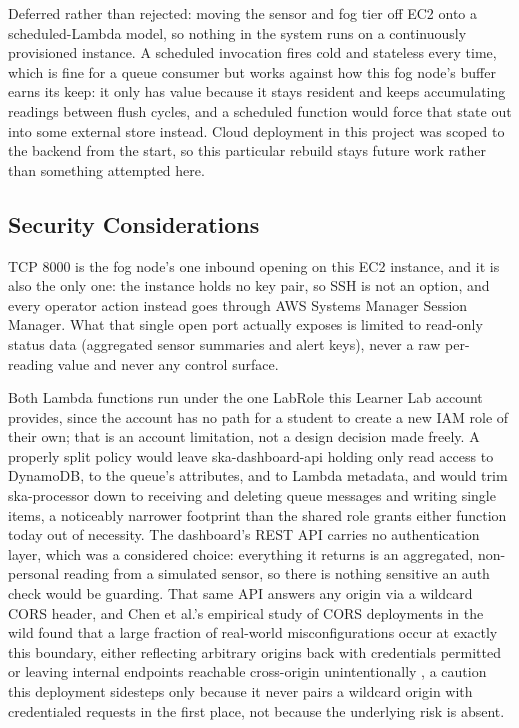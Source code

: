 \documentclass[conference]{IEEEtran}
\begin{document}
Deferred rather than rejected: moving the sensor and fog tier off EC2 onto a scheduled-Lambda model, so nothing in the system runs on a continuously provisioned instance. A scheduled invocation fires cold and stateless every time, which is fine for a queue consumer but works against how this fog node's buffer earns its keep: it only has value because it stays resident and keeps accumulating readings between flush cycles, and a scheduled function would force that state out into some external store instead. Cloud deployment in this project was scoped to the backend from the start, so this particular rebuild stays future work rather than something attempted here.

\subsection{Security Considerations}
TCP 8000 is the fog node's one inbound opening on this EC2 instance, and it is also the only one: the instance holds no key pair, so SSH is not an option, and every operator action instead goes through AWS Systems Manager Session Manager. What that single open port actually exposes is limited to read-only status data (aggregated sensor summaries and alert keys), never a raw per-reading value and never any control surface.

Both Lambda functions run under the one LabRole this Learner Lab account provides, since the account has no path for a student to create a new IAM role of their own; that is an account limitation, not a design decision made freely. A properly split policy would leave ska-dashboard-api holding only read access to DynamoDB, to the queue's attributes, and to Lambda metadata, and would trim ska-processor down to receiving and deleting queue messages and writing single items, a noticeably narrower footprint than the shared role grants either function today out of necessity. The dashboard's REST API carries no authentication layer, which was a considered choice: everything it returns is an aggregated, non-personal reading from a simulated sensor, so there is nothing sensitive an auth check would be guarding. That same API answers any origin via a wildcard CORS header, and Chen et al.'s empirical study of CORS deployments in the wild found that a large fraction of real-world misconfigurations occur at exactly this boundary, either reflecting arbitrary origins back with credentials permitted or leaving internal endpoints reachable cross-origin unintentionally \cite{ref7}, a caution this deployment sidesteps only because it never pairs a wildcard origin with credentialed requests in the first place, not because the underlying risk is absent.
\end{document}
